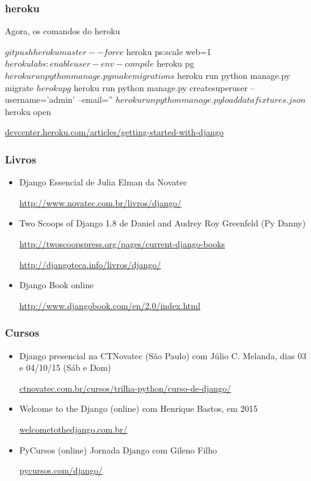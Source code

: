 \documentclass[aspectratio=169]{beamer}
\begin{document}
\begin{frame}[fragile]\frametitle{heroku}
	
Agora, os comandos do heroku

\begin{bashcode}
$ git push heroku master --force
$ heroku ps:scale web=1
$ heroku labs:enable user-env-compile
$ heroku pg
$ heroku run python manage.py makemigrations
$ heroku run python manage.py migrate
$ heroku pg
$ heroku run python manage.py createsuperuser --username='admin' --email=''
$ heroku run python manage.py loaddata fixtures.json
$ heroku open
\end{bashcode}

\vfill

\url{devcenter.heroku.com/articles/getting-started-with-django}

\end{frame}

\begin{frame}[fragile]\frametitle{Livros}

\begin{itemize}

	\item Django Essencial de Julia Elman da Novatec

\url{http://www.novatec.com.br/livros/django/}

	\item Two Scoops of Django 1.8 de Daniel and Audrey Roy Greenfeld (Py Danny)

\url{http://twoscoopspress.org/pages/current-django-books}


\url{http://djangoteca.info/livros/django/}

	\item Django Book online

\url{http://www.djangobook.com/en/2.0/index.html}


\end{itemize}

\end{frame}

\begin{frame}[fragile]\frametitle{Cursos}

\begin{itemize}

	\item Django presencial na CTNovatec (S\~ao Paulo) com J\'ulio C. Melanda, dias 03 e 04/10/15 (S\'ab e Dom)

	\url{ctnovatec.com.br/cursos/trilha-python/curso-de-django/}

	\item Welcome to the Django (online) com Henrique Bastos, em 2015

	\url{welcometothedjango.com.br/}

	\item PyCursos (online) Jornada Django com Gileno Filho

	\url{pycursos.com/django/}

\end{itemize}


\end{frame}
\end{document}
